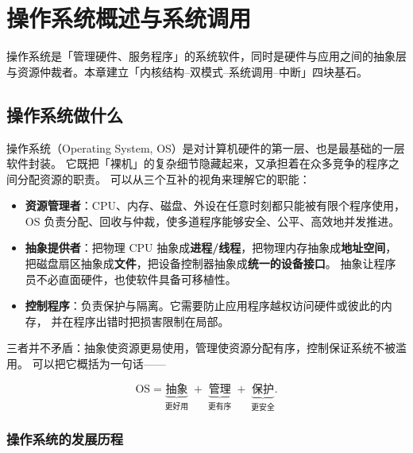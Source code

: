 \clearpage
\begingroup
\let\clearpage\relax
\let\cleardoublepage\relax
\vspace*{\fill}
\chapter{操作系统概述与系统调用}
\begin{center}
操作系统是「管理硬件、服务程序」的系统软件，同时是硬件与应用之间的抽象层与资源仲裁者。本章建立「内核结构--双模式--系统调用--中断」四块基石。
\end{center}
\vspace*{\fill}
\endgroup
\clearpage

\section{操作系统做什么}

操作系统（Operating System, OS）是对计算机硬件的第一层、也是最基础的一层软件封装。
它既把「裸机」的复杂细节隐藏起来，又承担着在众多竞争的程序之间分配资源的职责。
可以从三个互补的视角来理解它的职能：

\begin{itemize}
    \item \textbf{资源管理者}：CPU、内存、磁盘、外设在任意时刻都只能被有限个程序使用，
        OS 负责分配、回收与仲裁，使多道程序能够安全、公平、高效地并发推进。
    \item \textbf{抽象提供者}：把物理 CPU 抽象成\textbf{进程/线程}，把物理内存抽象成\textbf{地址空间}，
        把磁盘扇区抽象成\textbf{文件}，把设备控制器抽象成\textbf{统一的设备接口}。
        抽象让程序员不必直面硬件，也使软件具备可移植性。
    \item \textbf{控制程序}：负责保护与隔离。它需要防止应用程序越权访问硬件或彼此的内存，
        并在程序出错时把损害限制在局部。
\end{itemize}

\noindent 三者并不矛盾：抽象使资源更易使用，管理使资源分配有序，控制保证系统不被滥用。
可以把它概括为一句话——

\begin{equation}
    \text{OS} = \underbrace{\text{抽象}}_{\text{更好用}} \;+\; \underbrace{\text{管理}}_{\text{更有序}} \;+\; \underbrace{\text{保护}}_{\text{更安全}}.
\end{equation}

\subsection{操作系统的发展历程}

